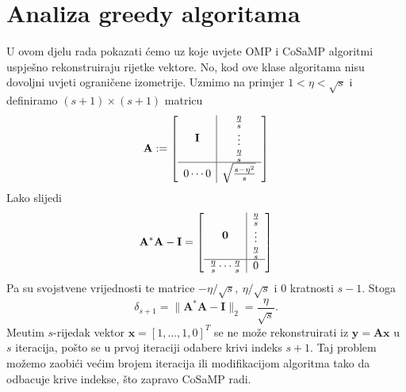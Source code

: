 \documentclass[a4paper,twoside,12pt]{memoir} %
\newcommand{\vect}[1]{\mathbf{#1}}
\renewcommand{\vec}{\vect}
\newcommand{\norm}[1]{\|{#1}\|}
\begin{document}
\section[Analiza greedy algoritama][Analiza greedy algoritama]{Analiza greedy algoritama}
U ovom djelu rada pokazati \'cemo uz koje uvjete OMP i CoSaMP algoritmi uspje\v{s}no rekonstruiraju rijetke vektore. No, kod ove klase algoritama nisu dovoljni uvjeti ograni\v{c}ene izometrije. Uzmimo na primjer $1 < \eta < \sqrt{s}$ i definiramo $(s+1) \times (s+1)$ matricu
\begin{equation}\label{6:39}
    \vec A :=
    \left[
        \begin{array}{c | c}
            \vec I & \begin{matrix*}
                \frac{\eta}{s}\\ 
                \vdots\\
                \frac{\eta}{s}\\ 
            \end{matrix*}\\
            \hline
            0 \cdots 0 & \sqrt{\frac{s-\eta^2}{s}}\\
        \end{array}
    \right]
\end{equation}
Lako slijedi
\begin{equation*}
    \vec A^* \vec A - \vec I =
    \left[
        \begin{array}{c | c}
            \vec 0 & \begin{matrix*}
                \frac{\eta}{s}\\ 
                \vdots\\
                \frac{\eta}{s}\\ 
            \end{matrix*}\\
            \hline
            \frac{\eta}{s}  \cdots  \frac{\eta}{s} & 0
        \end{array}
    \right]
\end{equation*}
Pa su svojstvene vrijednosti te matrice $-\eta/\sqrt{s},\ \eta/\sqrt{s}$ i $0$ kratnosti $s-1$. Stoga
\begin{equation*}
    \delta_{s+1} = \norm{\vec A^* \vec A - \vec I}_2 = \frac{\eta}{\sqrt{s}}. 
\end{equation*}
Me\dj utim $s$-rijedak vektor $\vec x = [1, \dots, 1, 0]^T$ se ne mo\v{z}e rekonstruirati iz $\vec y = \vec{Ax}$ u $s$ iteracija, po\v{s}to se u prvoj iteraciji odabere krivi indeks $s+1$. Taj problem mo\v{z}emo zaobi\'ci ve\'cim brojem iteracija ili modifikacijom algoritma tako da odbacuje krive indekse, \v{s}to zapravo CoSaMP radi.
\end{document}
